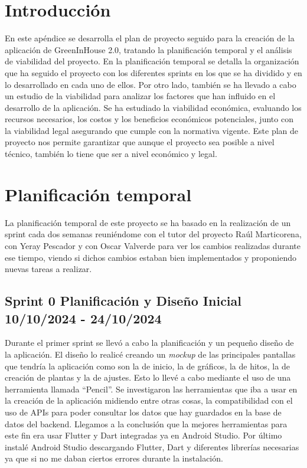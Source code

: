 
\section{Introducción}
En este apéndice se desarrolla el plan de proyecto seguido para la creación de la aplicación de GreenInHouse 2.0, tratando la planificación temporal y el análisis de viabilidad del proyecto. 
En la planificación temporal se detalla la organización que ha seguido el proyecto con los diferentes sprints en los que se ha dividido y en lo desarrollado en cada uno de ellos.
Por otro lado, también se ha llevado a cabo un estudio de la viabilidad para analizar los factores que han influido en el desarrollo de la aplicación. Se ha estudiado la viabilidad económica, evaluando los recursos necesarios, los costos y los beneficios económicos potenciales, junto con la viabilidad legal asegurando que cumple con la normativa vigente.
Este plan de proyecto nos permite garantizar que aunque el proyecto sea posible a nivel técnico, también lo tiene que ser a nivel económico y legal.

\section{Planificación temporal}
La planificación temporal de este proyecto se ha basado en la realización de un sprint cada dos semanas reuniéndome con el tutor del proyecto Raúl Marticorena, con Yeray Pescador y con Oscar Valverde para ver los cambios realizadas durante ese tiempo, viendo si dichos cambios estaban bien implementados y proponiendo nuevas tareas a realizar.

\subsection{Sprint 0 Planificación y Diseño Inicial 10/10/2024 - 24/10/2024}
Durante el primer sprint se llevó a cabo la planificación y un pequeño diseño de la aplicación. El diseño lo realicé creando un \textit{mockup} de las principales pantallas que tendría la aplicación como son la de inicio, la de gráficos, la de hitos, la de creación de plantas y la de ajustes. Esto lo llevé a cabo mediante el uso de una herramienta llamada  ``Pencil''.
Se investigaron las herramientas que iba a usar en la creación de la aplicación midiendo entre otras cosas, la compatibilidad con el uso de APIs para poder consultar los datos que hay guardados en la base de datos del backend. Llegamos a la conclusión que la mejores herramientas para este fin era usar Flutter y Dart integradas ya en Android Studio. 
Por último instalé Android Studio descargando Flutter, Dart y diferentes librerías necesarias ya que si no me daban ciertos errores durante la instalación.

